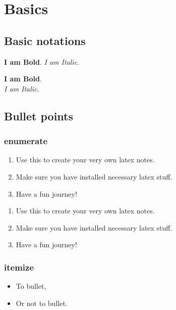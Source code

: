 \section{Basics}

\subsection{Basic notations}

\lstset{style=output}

\begin{TeXlstlisting}
\textbf{I am Bold}.
\textit{I am Italic}.
\end{TeXlstlisting}
\noindent
\textbf{I am Bold}. \\
\textit{I am Italic}. \bigskip

\subsection{Bullet points}

\subsubsection{enumerate}
\begin{TeXlstlisting}
\begin{enumerate}
    \item Use this to create your very own latex notes.
    \item Make sure you have installed necessary latex stuff.
    \item Have a fun journey!
\end{enumerate}
\end{TeXlstlisting}

\begin{enumerate}
    \item Use this to create your very own latex notes.
    \item Make sure you have installed necessary latex stuff.
    \item Have a fun journey!
\end{enumerate}

\subsubsection{itemize}
\begin{TeXlstlisting}
\begin{itemize}
    \item To bullet,
    \item Or not to bullet.
\end{itemize}
\end{TeXlstlisting}

